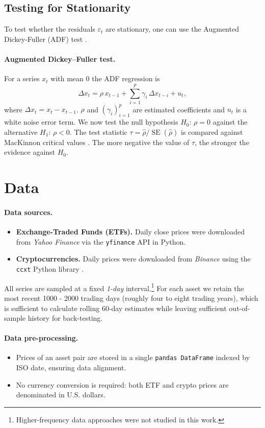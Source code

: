 \documentclass{article}
\begin{document}
\subsection{Testing for Stationarity}\label{sec:testing_for_stationarity}
To test whether the residuals \(\varepsilon_t\) are stationary, one can use the Augmented Dickey-Fuller (ADF) test \parencite{DickeyFuller1979}.
\paragraph{Augmented Dickey--Fuller test.}
For a series $x_t$ with mean 0 the ADF regression is
\[
\Delta x_t = \rho\,x_{t-1} + \sum_{i=1}^{p}\gamma_i\,\Delta x_{t-i} + u_t ,
\]
where $\Delta x_t = x_t - x_{t-1}$. $\rho$ and $\left(\gamma_i\right)_{i=1}^{p}$ are estimated coefficients and $u_t$ is a white noise error term.
We now test the null hypothesis $H_0:\,\rho = 0$ against the alternative $H_1:\,\rho < 0$.
The test statistic
\(
\tau = \hat{\rho}/\operatorname{SE}(\hat{\rho})
\)
is compared against MacKinnon critical values \parencite{MacKinnon2010CriticalValues}. The more negative the value of \(\tau\), the stronger the evidence against \(H_0\).
\newpage

\section{Data}
\paragraph{Data sources.}
\begin{itemize}
  \item \textbf{Exchange-Traded Funds (ETFs).}  Daily close prices were downloaded from \emph{Yahoo Finance} \parencite{yfinance} via the \texttt{yfinance} API in Python.
  \item \textbf{Cryptocurrencies.}  Daily prices were downloaded from \emph{Binance} \parencite{binance} using the \texttt{ccxt} Python library \parencite{ccxt}.
\end{itemize}
All series are sampled at a fixed \emph{1-day} interval.\footnote{Higher-frequency data approaches were not studied in this work.} For each asset we retain the most recent
1000 - 2000 trading days (roughly four to eight trading years), which is sufficient to calculate rolling 60-day estimates while leaving sufficient out-of-sample history for back-testing.
\paragraph{Data pre-processing.}
\begin{itemize}
    \item Prices of an asset pair are stored in a single \texttt{pandas DataFrame} \parencite{pandas} indexed by ISO date, ensuring data alignment.
    \item No currency conversion is required: both ETF and crypto prices are denominated in U.S. dollars.
\end{itemize}
\end{document}
